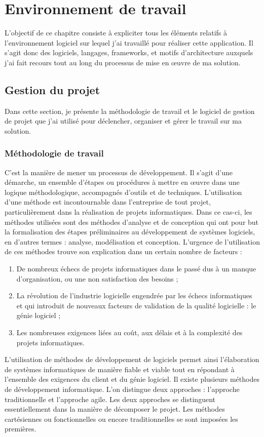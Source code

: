 \chapter{Environnement de travail}
\label{sec:EnvironnementDeTravail}

L'objectif de ce chapitre consiste à expliciter tous les éléments relatifs à l'environnement logiciel sur lequel j'ai travaillé pour réaliser cette application. Il s'agit donc des logiciels, langages, frameworks, et motifs d'architecture auxquels j'ai fait recours tout au long du processus de mise en œuvre de ma solution.

\section{Gestion du projet}
Dans cette section, je présente la méthodologie de travail et le logiciel de gestion de projet que j'ai utilisé pour déclencher, organiser et gérer le travail sur ma solution.

\subsection{Méthodologie de travail}
C'est la manière de mener un processus de développement. Il s’agit d’une démarche, un ensemble d’étapes ou procédures à mettre en œuvre dans une logique méthodologique, accompagnés d’outils et de techniques. L'utilisation d'une méthode est incontournable dans l'entreprise de tout projet, particulièrement dans la réalisation de projets informatiques. Dans ce cas-ci, les méthodes utilisées sont des méthodes d'analyse et de conception qui ont pour but la formalisation des étapes préliminaires au développement de systèmes logiciels, en d'autres termes : analyse, modélisation et conception. \newline
L'urgence de l'utilisation de ces méthodes trouve son explication dans un certain nombre de facteurs :
\begin{enumerate}
	\item De nombreux échecs de projets informatiques dans le passé dus à un manque d'organisation, ou une non satisfaction des besoins ;
	\item La révolution de l'industrie logicielle engendrée par les échecs informatiques et qui introduit de nouveaux facteurs de validation de la
		qualité logicielle : le génie logiciel ;
	\item Les nombreuses exigences liées au coût, aux délais et à la complexité des projets informatiques.
\end{enumerate}
L'utilisation de méthodes de développement de logiciels permet ainsi l'élaboration de systèmes informatiques de manière fiable et viable tout en répondant à l'ensemble des exigences du client et du génie logiciel.
\newline \newline
Il existe plusieurs méthodes de développement informatique. L’on distingue deux approches : l’approche traditionnelle et l’approche agile. Les deux approches se distinguent essentiellement dans la manière de décomposer le projet. Les méthodes cartésiennes ou fonctionnelles ou encore traditionnelles se sont imposées les premières.

